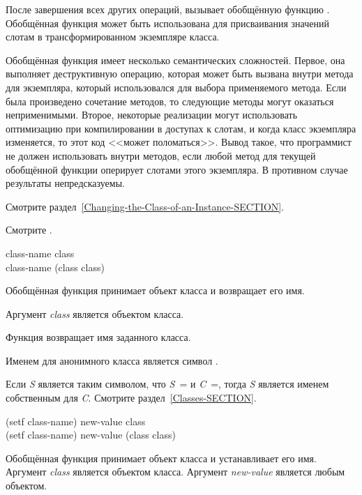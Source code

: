 \begin{defun}
После завершения всех других операций,  вызывает обобщённую
функцию . Обобщённая функция
 может быть использована для
присваивания значений слотам в трансформированном экземпляре класса.

Обобщённая функция  имеет несколько семантических
сложностей.
Первое, она выполняет деструктивную операцию, которая может быть вызвана внутри
метода для экземпляра, который использовался для выбора применяемого
метода. Если была произведено сочетание методов, то следующие методы могут
оказаться неприменимыми.
Второе, некоторые реализации могут использовать оптимизацию при
компилировании в доступах к слотам, и когда класс экземпляра изменяется, то этот
код <<может поломаться>>.
Вывод такое, что программист не должен использовать  внутри
методов, если любой метод для текущей обобщённой функции оперирует слотами этого
экземпляра. В противном случае результаты непредсказуемы.

Смотрите раздел~\ref{Changing-the-Class-of-an-Instance-SECTION}.

Смотрите .
\end{defun}

\begin{defun}
class-name class \\
class-name (class class)

Обобщённая функция  принимает объект класса и возвращает его
имя.

Аргумент \emph{class} является объектом класса.

Функция возвращает имя заданного класса.

Именем для анонимного класса является символ .

Если \emph{S} является таким символом, что \emph{S}~=
и \emph{C}~=, тогда \emph{S} является именем
собственным для \emph{C}. Смотрите раздел~\ref{Classes-SECTION}.
\end{defun}

\begin{defun}
(setf class-name) new-value class \\
(setf class-name) new-value (class class)

Обобщённая функция  принимает объект класса и
устанавливает его имя.
Аргумент \emph{class} является объектом класса.
Аргумент \emph{new-value} является любым объектом.
\end{defun}

